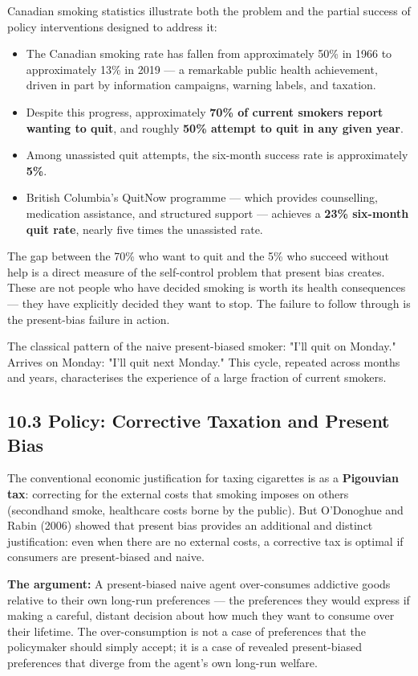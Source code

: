 \documentclass[12pt, letterpaper]{article}
\begin{document}
Canadian smoking statistics illustrate both the problem and the partial success of policy interventions designed to address it:
\begin{itemize}
\item The Canadian smoking rate has fallen from approximately 50\% in 1966 to approximately 13\% in 2019 --- a remarkable public health achievement, driven in part by information campaigns, warning labels, and taxation.
\item Despite this progress, approximately \textbf{70\% of current smokers report wanting to quit}, and roughly \textbf{50\% attempt to quit in any given year}.
\item Among unassisted quit attempts, the six-month success rate is approximately \textbf{5\%}.
\item British Columbia's QuitNow programme --- which provides counselling, medication assistance, and structured support --- achieves a \textbf{23\% six-month quit rate}, nearly five times the unassisted rate.
\end{itemize}

The gap between the 70\% who want to quit and the 5\% who succeed without help is a direct measure of the self-control problem that present bias creates. These are not people who have decided smoking is worth its health consequences --- they have explicitly decided they want to stop. The failure to follow through is the present-bias failure in action.

The classical pattern of the naive present-biased smoker: "I'll quit on Monday." Arrives on Monday: "I'll quit next Monday." This cycle, repeated across months and years, characterises the experience of a large fraction of current smokers.


\subsection{10.3 Policy: Corrective Taxation and Present Bias}


The conventional economic justification for taxing cigarettes is as a \textbf{Pigouvian tax}: correcting for the external costs that smoking imposes on others (secondhand smoke, healthcare costs borne by the public). But O'Donoghue and Rabin (2006) showed that present bias provides an additional and distinct justification: even when there are no external costs, a corrective tax is optimal if consumers are present-biased and naive.

\textbf{The argument:} A present-biased naive agent over-consumes addictive goods relative to their own long-run preferences --- the preferences they would express if making a careful, distant decision about how much they want to consume over their lifetime. The over-consumption is not a case of preferences that the policymaker should simply accept; it is a case of revealed present-biased preferences that diverge from the agent's own long-run welfare.
\end{document}

